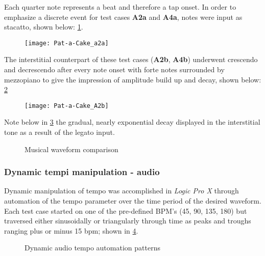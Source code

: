 
Each quarter note represents a beat and therefore a tap onset. In order to emphasize a discrete event for test cases \textbf{A2a} and \textbf{A4a}, notes were input as stacatto, shown below: \ref{fig:pat-a-cake_a2a}.

\begin{figure}[H]
    \centering
    \texttt{[image: Pat-a-Cake\_a2a]}
    \label{fig:pat-a-cake_a2a}
\end{figure}

The interstitial counterpart of these test cases (\textbf{A2b}, \textbf{A4b}) underwent crescendo and decrescendo after every note onset with forte notes surrounded by mezzopiano to give the impression of amplitude build up and decay, shown below: \ref{fig:pat-a-cake_a2b} 

\begin{figure}[H]
    \centering
    \texttt{[image: Pat-a-Cake\_A2b]}
    \label{fig:pat-a-cake_a2b}
\end{figure}

Note below in \ref{fig:music_comparison} the gradual, nearly exponential decay displayed in the interstitial tone as a result of the legato input.

\begin{figure}[H]
    \centering
    \caption{Musical waveform comparison}
        \qquad
    \label{fig:music_comparison}
\end{figure}

\subsubsection{Dynamic tempi manipulation - audio}
Dynamic manipulation of tempo was accomplished in \textit{Logic Pro X} through automation of the tempo parameter over the time period of the desired waveform. Each test case started on one of the pre-defined BPM's (45, 90, 135, 180) but traversed either sinusoidally or triangularly through time as peaks and troughs ranging plus or minus 15 bpm; shown in \ref{fig:dynamic_audio}.

\begin{figure}[H]
    \centering
    \caption{Dynamic audio tempo automation patterns}
        \qquad
    \label{fig:dynamic_audio}
\end{figure}

